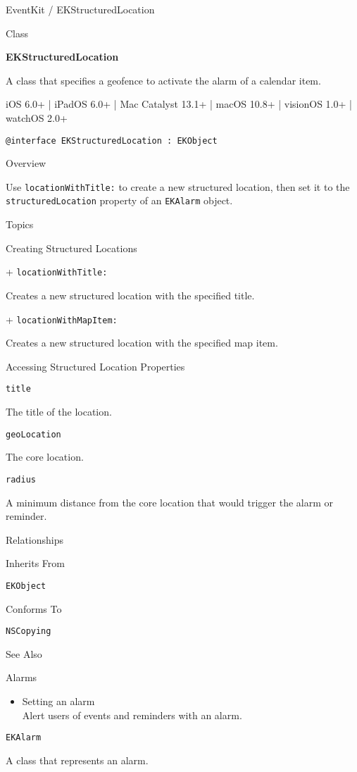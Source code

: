 \documentclass{article}
\title{}
\author{}
\date{}
\begin{document}
EventKit / EKStructuredLocation

Class

\textbf{EKStructuredLocation}

A class that specifies a geofence to activate the alarm of a calendar item.

iOS 6.0+ | iPadOS 6.0+ | Mac Catalyst 13.1+ | macOS 10.8+ | visionOS 1.0+ | watchOS 2.0+

\texttt{@interface EKStructuredLocation : EKObject}

Overview

Use \texttt{locationWithTitle:} to create a new structured location, then set it to the \texttt{structuredLocation} property of an \texttt{EKAlarm} object.

Topics

Creating Structured Locations

+ \texttt{locationWithTitle:}

Creates a new structured location with the specified title.

+ \texttt{locationWithMapItem:}

Creates a new structured location with the specified map item.

Accessing Structured Location Properties

\texttt{title}

The title of the location.

\texttt{geoLocation}

The core location.

\texttt{radius}

A minimum distance from the core location that would trigger the alarm or reminder.

Relationships

Inherits From

\texttt{EKObject}

Conforms To

\texttt{NSCopying}

See Also

Alarms

\begin{itemize}
    \item Setting an alarm\\
    Alert users of events and reminders with an alarm.
\end{itemize}

\texttt{EKAlarm}

A class that represents an alarm.

\newpage
\end{document}
